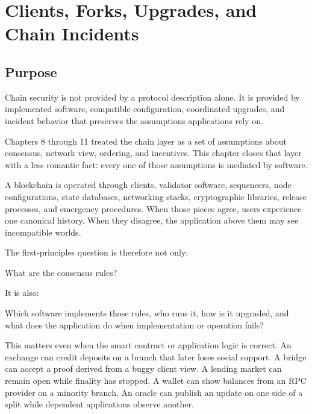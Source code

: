 \chapter{Clients, Forks, Upgrades, and Chain Incidents}

\section{Purpose}

\begin{principlebox}
Chain security is not provided by a protocol description alone. It is provided by implemented software, compatible configuration, coordinated upgrades, and incident behavior that preserves the assumptions applications rely on.
\end{principlebox}

Chapters 8 through 11 treated the chain layer as a set of assumptions about consensus, network view, ordering, and incentives. This chapter closes that layer with a less romantic fact: every one of those assumptions is mediated by software.

A blockchain is operated through clients, validator software, sequencers, node configurations, state databases, networking stacks, cryptographic libraries, release processes, and emergency procedures. When those pieces agree, users experience one canonical history. When they disagree, the application above them may see incompatible worlds.

The first-principles question is therefore not only:

\begin{codeblock}
What are the consensus rules?
\end{codeblock}

It is also:

\begin{codeblock}
Which software implements those rules, who runs it, how is it upgraded,
and what does the application do when implementation or operation fails?
\end{codeblock}

This matters even when the smart contract or application logic is correct. An exchange can credit deposits on a branch that later loses social support. A bridge can accept a proof derived from a buggy client view. A lending market can remain open while finality has stopped. A wallet can show balances from an RPC provider on a minority branch. An oracle can publish an update on one side of a split while dependent applications observe another.

